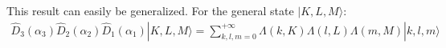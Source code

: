 \documentclass[%
 reprint,
 amsmath,amssymb,
 aps,
onecolumn
]{revtex4-2}
\begin{document}
This result can easily be generalized. For the general state $|K,L,M\rangle$:
\begin{eqnarray}
  \hat{D}_3(\alpha_3)\hat{D}_2(\alpha_2)\hat{D}_1(\alpha_1) |K,L,M\rangle =
  \sum_{k,l,m=0}^{+\infty} \Lambda(k,K) \Lambda(l,L) \Lambda(m,M) |k,l,m\rangle
  \label{D123|KLM}
\end{eqnarray}









\end{document}
